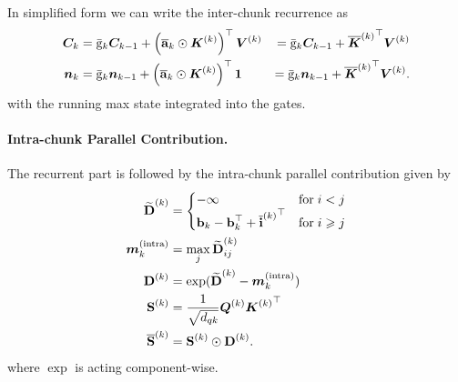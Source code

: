\documentclass{article}
\newcommand{\mintra}{\bm{m}^{(\text{intra})}}
\begin{document}
    In simplified form we can write the inter-chunk recurrence as
    \begin{align}
        \bm{C}_k & = \bar{\mathrm{g}}_k \bm{C}_{k-1} + \left( \overline{\bm{\mathrm{a}}}_k \odot \bm{K}^{(k)}\right)^\top \bm{V}^{(k)} & = \bar{\mathrm{g}}_k \bm{C}_{k-1} + {\overline{\bm{K}}^{(k)}}^\top \bm{V}^{(k)}  \\
        \bm{n}_k & = \bar{\mathrm{g}}_k \bm{n}_{k-1} + \left( \overline{\bm{\mathrm{a}}}_k \odot \bm{K}^{(k)}\right)^\top \bm{1}    & = \bar{\mathrm{g}}_k \bm{n}_{k-1} + {\overline{\bm{K}}^{(k)}}^\top \bm{V}^{(k)}.
    \end{align}
    with the running max state integrated into the gates.

    \paragraph{Intra-chunk Parallel Contribution.}
    The recurrent part is followed by the intra-chunk parallel contribution given by
    \begin{align}
        \widetilde{\bm{\rD}}^{(k)} & = \begin{cases}
                                           - \infty                                                        & \text{for} \; i < j    \\ %
                                           \bm{\Rb}_k - \bm{\Rb}_k^\top + {\overline{\bm{\Ri}}^{(k)}}^\top & \text{for} \; i \geq j %
                                       \end{cases} \\
        \mintra_k                  & = \max_j \widetilde{\bm{\rD}}^{(k)}_{ij}                                                                                                    \\
        \bm{\rD}^{(k)}             & = \exp(\widetilde{\bm{\rD}}^{(k)} - \mintra_k)                                                                                              \\
        \bm{\rS}^{(k)}             & = \frac{1}{\sqrt{d_{qk}}} {\BQ^{(k)}} {\BK^{(k)}}^\top                                                                                      \\
        \overline{\bm{\rS}}^{(k)}  & = \bm{\rS}^{(k)} \odot \bm{\rD}^{(k)}.
    \end{align}
    where $\exp$ is acting component-wise.
\end{document}
